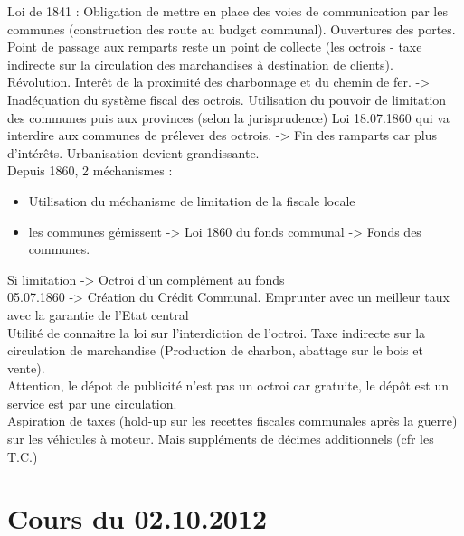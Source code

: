 \documentclass{book}
\begin{document}
\null


Loi de 1841 : Obligation de mettre en place des voies de communication par les communes (construction des route au budget communal). Ouvertures des portes. Point de passage aux remparts reste un point de collecte (les octrois - taxe indirecte sur la circulation des marchandises à destination de clients).\\

Révolution. Interêt de la proximité des charbonnage et du chemin de fer. -> Inadéquation du système fiscal des octrois. Utilisation du pouvoir de limitation des communes puis aux provinces (selon la jurisprudence) Loi 18.07.1860 qui va interdire aux communes de prélever des octrois. -> Fin des ramparts car plus d'intérêts. Urbanisation devient grandissante. \\

Depuis 1860, 2 méchanismes :\\


\begin{itemize}
\item Utilisation du méchanisme de limitation de la fiscale locale
\item les communes gémissent -> Loi 1860 du fonds communal -> Fonds des communes. 
\end{itemize}
\null

Si limitation -> Octroi d'un complément au fonds\\

05.07.1860 -> Création du Crédit Communal. Emprunter avec un meilleur taux avec la garantie de l'Etat central\\

Utilité de connaitre la loi sur l'interdiction de l'octroi. Taxe indirecte sur la circulation de marchandise (Production de charbon, abattage sur le bois et vente).\\

Attention, le dépot de publicité n'est pas un octroi car gratuite, le dépôt est un service est par une circulation.\\

Aspiration de taxes (hold-up sur les recettes fiscales communales après la guerre) sur les véhicules à moteur. Mais suppléments de décimes additionnels (cfr les T.C.)\\

\chapter{Cours du 02.10.2012}
\end{document}

